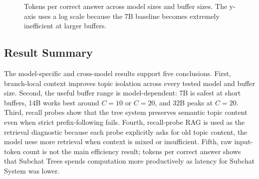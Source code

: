 \documentclass[pdflatex,sn-mathphys-num]{sn-jnl}%
\theoremstyle{thmstyleone}%
\theoremstyle{thmstyletwo}%
\theoremstyle{thmstylethree}%
\begin{document}
\begin{figure}[htbp]
\centering
{}
\caption{Tokens per correct answer across model sizes and buffer sizes. The y-axis uses a log scale because the 7B baseline becomes extremely inefficient at larger buffers.}
\label{fig:tpca_buffer_all}
\end{figure}

\subsection{Result Summary}\label{subsec:findings_summary}

The model-specific and cross-model results support five conclusions. First, branch-local context improves topic isolation across every tested model and buffer size. Second, the useful buffer range is model-dependent: 7B is safest at short buffers, 14B works best around $C=10$ or $C=20$, and 32B peaks at $C=20$. Third, recall probes show that the tree system preserves semantic topic content even when strict prefix-following fails. Fourth, recall-probe RAG is used as the retrieval diagnostic because each probe explicitly asks for old topic content, the model uese more retrieval when context is mixed or insufficient. Fifth, raw input-token count is not the main efficiency result; tokens per correct answer shows that Subchat Trees spends computation more productively as latency for Subchat System was lower.
\end{document}
